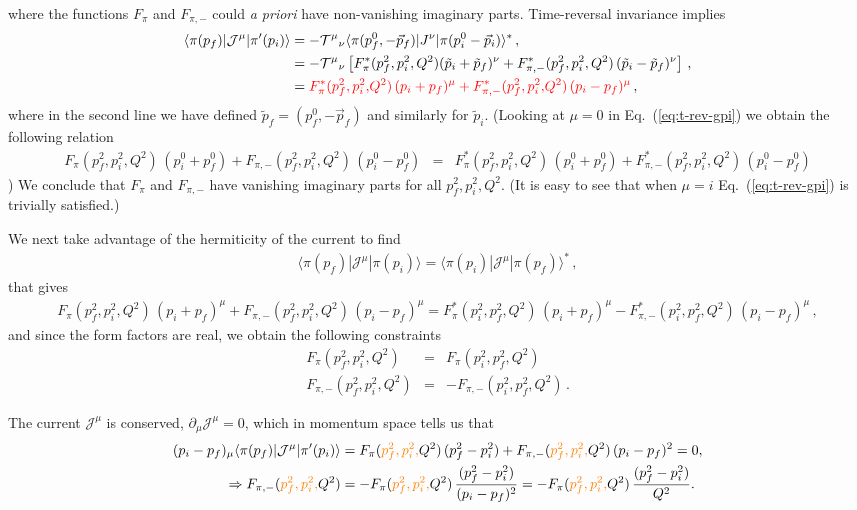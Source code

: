	{\ab where the functions $F_\pi$ and $F_{\pi,-}$ could {\em a priori} have non-vanishing imaginary parts.
	Time-reversal invariance implies
	\begin{align}
	\langle\pi(p_f)|{\mathcal{J}}^{\mu}|\pi'(p_i)\rangle&= -{{\cal T}^\mu}_\nu \langle\pi(p_f^0,-\vec{p}_f)|J^\nu|\pi(p_i^0-\vec{p}_i)\rangle^*\,, \\
	&=- {{\cal T}^\mu}_\nu \left[F^*_\pi(p_f^2,p_i^2,Q^2)(\tilde{p}_i+\tilde{p}_f)^\nu+F^*_{\pi,-}(p_f^2,p_i^2,Q^2)\,(\tilde{p}_i-\tilde{p}_f)^\nu\right] \,, \label{eq:t-rev-gpi} \\
	&={\color{red} F^*_\pi({  p_f^2,p_i^2,}Q^2)\,(p_i+p_f)^\mu+F^*_{\pi,-}({  p_f^2,p_i^2,}Q^2)\,(p_i-p_f)^\mu } \,,
	\end{align}
	where in the second line we have defined $\tilde{p}_f=(p^0_f,-\vec{p}_f)$ and similarly for $\tilde{p}_i$. 
	{ (Looking at $\mu =0$ in Eq.~(\ref{eq:t-rev-gpi}) we obtain the following relation
	\begin{eqnarray}
	F_\pi(p_f^2,p_i^2,Q^2)\,(p^0_i+p^0_f)+F_{\pi,-}(p_f^2,p_i^2,Q^2)\,(p_i^0-p_f^0)&=&
	F^*_\pi(p_f^2,p_i^2,Q^2)\,(p^0_i+p^0_f)+F^*_{\pi,-}(p_f^2,p_i^2,Q^2)\,(p_i^0-p_f^0)
	\end{eqnarray})}
	We conclude that $F_\pi$ and $F_{\pi,-}$ have vanishing imaginary parts for all $p_f^2,p_i^2,Q^2$.
	{\mh (It is easy to see that when $\mu=i$ Eq.~(\ref{eq:t-rev-gpi}) is trivially satisfied.)}
	
	We next take advantage of the hermiticity of the current to find
	\begin{align}
	\langle\pi(p_f)|{\mathcal{J}}^{\mu}|\pi(p_i)\rangle=\langle\pi(p_i)|{\mathcal{J}}^{\mu}|\pi(p_f)\rangle^*\, ,
	\end{align}
	that gives
	\begin{align}
	F_\pi(p_f^2,p_i^2,Q^2)\,(p_i+p_f)^\mu+F_{\pi,-}(p_f^2,p_i^2,Q^2)\,(p_i-p_f)^\mu=
	F^*_\pi(p_i^2,p_f^2,Q^2)\,(p_i+p_f)^\mu-F^*_{\pi,-}(p_i^2,p_f^2,Q^2)\,(p_i-p_f)^\mu\, ,
	\end{align}
	and since the form factors are real, we obtain the following constraints
	\begin{eqnarray}
	F_\pi(p_f^2,p_i^2,Q^2)&=&F_\pi(p_i^2,p_f^2,Q^2)\, \\
	F_{\pi,-}(p_f^2,p_i^2,Q^2)&=&-F_{\pi,-}(p_i^2,p_f^2,Q^2)\, .
	\end{eqnarray}}
The current ${\mathcal{J}}^{\mu}$ is conserved, $\partial_\mu {\mathcal{J}}^{\mu}=0$, which in momentum space tells us that
	\begin{align}
	(p_i-p_f)_\mu\langle\pi(p_f)|{\mathcal{J}}^{\mu}|\pi'(p_i)\rangle&=
	F_{\pi}({\color{orange} p_f^2,p_i^2,}Q^2)\, (p_f^2-p_i^2)
	+
	F_{\pi,-}({\color{orange} p_f^2,p_i^2,}Q^2)\,(p_i-p_f)^2
	=0,
	\\
	\Rightarrow
	F_{\pi,-}({\color{orange} p_f^2,p_i^2,}Q^2)
	&=-
	F_{\pi}({\color{orange} p_f^2,p_i^2,}Q^2)\, \frac{(p_f^2-p_i^2)}{(p_i-p_f)^2}
	= 
	-F_{\pi}({\color{orange} p_f^2,p_i^2,}Q^2)\, \frac{(p_f^2-p_i^2)}{Q^2}.
	\end{align}
